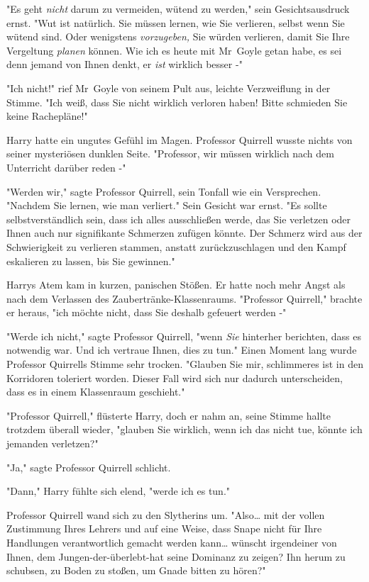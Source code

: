 {"Es geht \emph{nicht} darum zu vermeiden, wütend zu werden," sein Gesichtsausdruck ernst. "Wut ist natürlich. Sie müssen lernen, wie Sie verlieren, selbst wenn Sie wütend sind. Oder wenigstens \emph{vorzugeben,} Sie würden verlieren, damit Sie Ihre Vergeltung \emph{planen} können. Wie ich es heute mit Mr~Goyle getan habe, es sei denn jemand von Ihnen denkt, er \emph{ist} wirklich besser -"

"Ich nicht!" rief Mr~Goyle von seinem Pult aus, leichte Verzweiflung in der Stimme. "Ich weiß, dass Sie nicht wirklich verloren haben! Bitte schmieden Sie keine Rachepläne!"

Harry hatte ein ungutes Gefühl im Magen. Professor Quirrell wusste nichts von seiner mysteriösen dunklen Seite. "Professor, wir müssen wirklich nach dem Unterricht darüber reden -"

"Werden wir," sagte Professor Quirrell, sein Tonfall wie ein Versprechen. "Nachdem Sie lernen, wie man verliert." Sein Gesicht war ernst. "Es sollte selbstverständlich sein, dass ich alles ausschließen werde, das Sie verletzen oder Ihnen auch nur signifikante Schmerzen zufügen könnte. Der Schmerz wird aus der Schwierigkeit zu verlieren stammen, anstatt zurückzuschlagen und den Kampf eskalieren zu lassen, bis Sie gewinnen."

Harrys Atem kam in kurzen, panischen Stößen. Er hatte noch mehr Angst als nach dem Verlassen des Zaubertränke-Klassenraums. "Professor Quirrell," brachte er heraus, "ich möchte nicht, dass Sie deshalb gefeuert werden -"

"Werde ich nicht," sagte Professor Quirrell, "wenn \emph{Sie} hinterher berichten, dass es notwendig war. Und ich vertraue Ihnen, dies zu tun." Einen Moment lang wurde Professor Quirrells Stimme sehr trocken. "Glauben Sie mir, schlimmeres ist in den Korridoren toleriert worden. Dieser Fall wird sich nur dadurch unterscheiden, dass es in einem Klassenraum geschieht."

"Professor Quirrell," flüsterte Harry, doch er nahm an, seine Stimme hallte trotzdem überall wieder, "glauben Sie wirklich, wenn ich das nicht tue, könnte ich jemanden verletzen?"

"Ja," sagte Professor Quirrell schlicht.

"Dann," Harry fühlte sich elend, "werde ich es tun."

Professor Quirrell wand sich zu den Slytherins um. "Also… mit der vollen Zustimmung Ihres Lehrers und auf eine Weise, dass Snape nicht für Ihre Handlungen verantwortlich gemacht werden kann… wünscht irgendeiner von Ihnen, dem Jungen-der-überlebt-hat seine Dominanz zu zeigen? Ihn herum zu schubsen, zu Boden zu stoßen, um Gnade bitten zu hören?"

}
